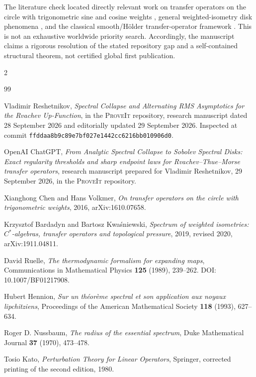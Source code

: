 \documentclass[11pt,a4paper]{article}
\theoremstyle{definition}
\theoremstyle{remark}
\newcommand{\repo}{\textsc{ProveIt}}
\begin{document}
The literature check located directly relevant work on transfer operators on
the circle with trigonometric sine and cosine weights \cite{chen-volkmer},
general weighted-isometry disk phenomena \cite{bardadyn-kwasniewski}, and the
classical smooth/H\"older transfer-operator framework
\cite{ruelle,hennion}.  This is not an exhaustive worldwide priority search.
Accordingly, the manuscript claims a rigorous resolution of the stated
repository gap and a self-contained structural theorem, not certified global
first publication.

\begingroup
\scriptsize
\raggedright
\raggedcolumns
\setlength{\parskip}{0pt}
\setlength{\columnsep}{1.25em}
\begin{multicols}{2}
\begin{thebibliography}{99}
\setlength{\itemsep}{0pt}

Vladimir Reshetnikov,
\emph{Spectral Collapse and Alternating RMS Asymptotics for the Rvachev
Up-Function}, in the \repo{} repository, research manuscript dated
28 September 2026 and editorially updated 29 September 2026.
Inspected at commit
\texttt{ffddaa8b9c89e7bf027e1442cc6216bb010906d0}.

OpenAI ChatGPT,
\emph{From Analytic Spectral Collapse to Sobolev Spectral Disks: Exact
regularity thresholds and sharp endpoint laws for Rvachev--Thue--Morse
transfer operators}, research manuscript prepared for Vladimir Reshetnikov,
29 September 2026, in the \repo{} repository.

Xianghong Chen and Hans Volkmer,
\emph{On transfer operators on the circle with trigonometric weights},
2016, arXiv:1610.07658.

Krzysztof Bardadyn and Bartosz Kwa\'sniewski,
\emph{Spectrum of weighted isometries: $C^*$-algebras, transfer operators
and topological pressure}, 2019, revised 2020, arXiv:1911.04811.

David Ruelle,
\emph{The thermodynamic formalism for expanding maps},
Communications in Mathematical Physics \textbf{125} (1989), 239--262.
DOI: 10.1007/BF01217908.

Hubert Hennion,
\emph{Sur un th\'eor\`eme spectral et son application aux noyaux
lipchitziens},
Proceedings of the American Mathematical Society \textbf{118} (1993),
627--634.

Roger D. Nussbaum,
\emph{The radius of the essential spectrum},
Duke Mathematical Journal \textbf{37} (1970), 473--478.

Tosio Kato,
\emph{Perturbation Theory for Linear Operators},
Springer, corrected printing of the second edition, 1980.

\end{thebibliography}
\end{multicols}
\endgroup
\end{document}
